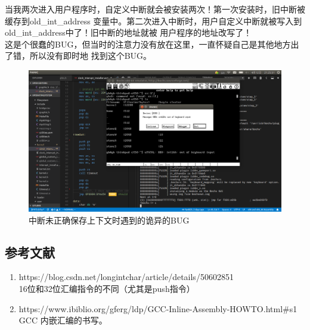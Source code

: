 \documentclass[a4paper]{article}
\begin{document}
    当我两次进入用户程序时，自定义中断就会被安装两次！第一次安装时，旧中断被缓存到old\_int\_address
    变量中。第二次进入中断时，用户自定义中断就被写入到old\_int\_address中了！旧中断的地址就被
    用户程序的地址改写了！\\
    
    这是个很蠢的BUG，但当时的注意力没有放在这里，一直怀疑自己是其他地方出了错，所以没有即时地
    找到这个BUG。
    
    \begin{figure}[H]
        \begin{center}
        \includegraphics[scale=0.3]{assets/bug_full_screen.png}
        \caption{中断未正确保存上下文时遇到的诡异的BUG\label{fig:bug}} 
        \end{center} 
    \end{figure} 
    


\begin{appendices}
\section{参考文献} \label{sec:reference}
\begin{enumerate}
    \item https://blog.csdn.net/longintchar/article/details/50602851 \\
    16位和32位汇编指令的不同（尤其是push指令）
    \item https://www.ibiblio.org/gferg/ldp/GCC-Inline-Assembly-HOWTO.html\#s1 \\
    GCC 内嵌汇编的书写。
  \end{enumerate}
\end{appendices}
\end{document}
